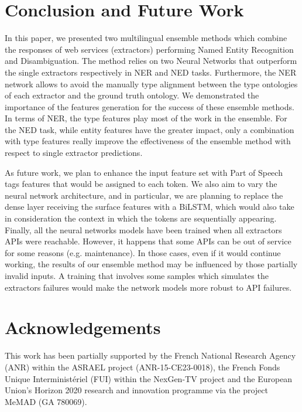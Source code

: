 \documentclass{llncs}
\begin{document}
\section{Conclusion and Future Work}
\label{sec:conclusion}
In this paper, we presented two multilingual ensemble methods which combine the responses of web services (extractors) performing Named Entity Recognition and Disambiguation. The method relies on two Neural Networks that outperform the single extractors respectively in NER and NED tasks. Furthermore, the NER network allows to avoid the manually type alignment between the type ontologies of each extractor and the ground truth ontology. We demonstrated the importance of the features generation for the success of these ensemble methods. In terms of NER, the type features play most of the work in the ensemble. For the NED task, while entity features have the greater impact, only a combination with type features really improve the effectiveness of the ensemble method with respect to single extractor predictions.

As future work, we plan to enhance the input feature set with Part of Speech tags features that would be assigned to each token. We also aim
to vary the neural network architecture, and in particular, we are planning to replace the dense layer receiving the surface features with a BiLSTM, which would also take in consideration the context in which the tokens are sequentially appearing. Finally, all the neural networks models have been trained when all extractors APIs were reachable. However, it happens that some APIs can be out of service for some reasons (e.g. maintenance). In those cases, even if it would continue working, the results of our ensemble method may be influenced by those partially invalid inputs. A training that involves some samples which simulates the extractors failures would make the network models more robust to API failures.


\section*{Acknowledgements}
This work has been partially supported by the French National Research Agency (ANR) within the ASRAEL project (ANR-15-CE23-0018), the French Fonds Unique Interminist\'eriel (FUI) within the NexGen-TV project and the European  Union's Horizon 2020 research and innovation programme via the project MeMAD (GA 780069).



\end{document}
